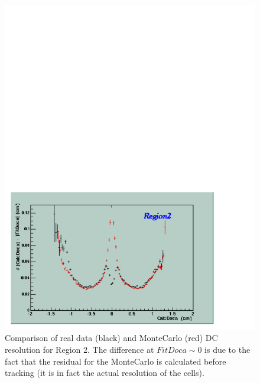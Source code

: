 \begin{figure}[h]
 \begin{center}
 \includegraphics[width = 12cm, bb=-30 0 620 350]{acceptance/img/reg2r} 
  \caption[Comparison of real data and MonteCarlo DC resolution for Region 2.]
          { Comparison of real data (black) and MonteCarlo (red) DC resolution for Region 2.
	             The difference at $FitDoca\sim 0$ is due to the fact that the residual for the MonteCarlo
		     is calculated before tracking (it is in fact the actual resolution of the cells).}
 \label{fig:dc_sigma_comp}
 \end{center}
\end{figure}




